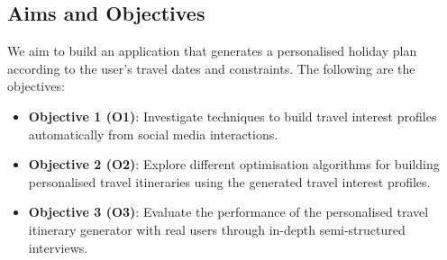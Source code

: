 
\subsection{Aims and Objectives}

We aim to build an application that
generates a personalised holiday plan according to the
user's travel dates and constraints. The following are the objectives:


\begin{itemize}
    \item \textbf{Objective 1 (O1)}: Investigate techniques to build travel interest
    profiles automatically from social media interactions.  
    \item \textbf{Objective 2 (O2)}: Explore different optimisation algorithms for
    building personalised travel itineraries using the
    generated travel interest profiles. 
    \item \textbf{Objective 3 (O3)}: Evaluate the
    performance of the personalised travel itinerary
    generator with real users through in-depth
    semi-structured interviews. 

\end{itemize}



